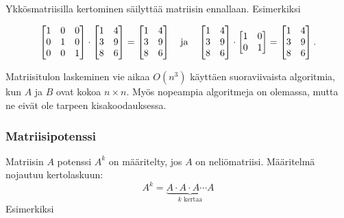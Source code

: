 Ykkösmatriisilla kertominen säilyttää matriisin
ennallaan. Esimerkiksi

\[
 \begin{bmatrix}
  1 & 0 & 0 \\
  0 & 1 & 0 \\
  0 & 0 & 1 \\
 \end{bmatrix}
\cdot
 \begin{bmatrix}
  1 & 4 \\
  3 & 9 \\
  8 & 6 \\
 \end{bmatrix}
=
 \begin{bmatrix}
  1 & 4 \\
  3 & 9 \\
  8 & 6 \\
 \end{bmatrix} \hspace{10px} \textrm{ja} \hspace{10px}
 \begin{bmatrix}
  1 & 4 \\
  3 & 9 \\
  8 & 6 \\
 \end{bmatrix}
\cdot
 \begin{bmatrix}
  1 & 0 \\
  0 & 1 \\
 \end{bmatrix}
=
 \begin{bmatrix}
  1 & 4 \\
  3 & 9 \\
  8 & 6 \\
 \end{bmatrix}.
\]

Matriisitulon laskeminen vie aikaa $O(n^3)$
käyttäen suoraviivaista algoritmia,
kun $A$ ja $B$ ovat kokoa $n \times n$.
Myös nopeampia algoritmeja on olemassa,
mutta ne eivät ole tarpeen kisakoodauksessa.

\subsubsection{Matriisipotenssi}

Matriisin $A$ potenssi $A^k$ on
määritelty, jos $A$ on neliömatriisi.
Määritelmä nojautuu kertolaskuun:
\[ A^k = \underbrace{A \cdot A \cdot A \cdots A}_{\textrm{$k$ kertaa}} \]
Esimerkiksi

